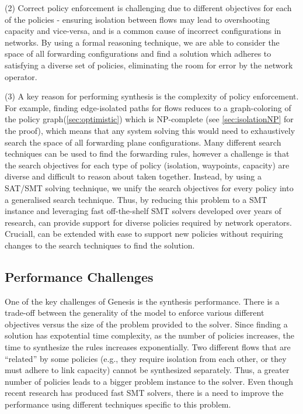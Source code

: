 
(2) Correct policy enforcement is challenging due to different
objectives for each of the policies - ensuring isolation between flows
may lead to overshooting capacity and vice-versa, and is a common
cause of incorrect configurations in networks. By using a formal
reasoning technique, we are able to consider the space of all
forwarding configurations and find a solution which adheres to
satisfying a diverse set of policies, eliminating the room for error
by the network operator. 

(3) A key reason for performing synthesis is the complexity of
policy enforcement. For example, finding edge-isolated paths
 for flows reduces to a
graph-coloring of the policy graph(\cref{sec:optimistic}) which is
NP-complete (see \cref{sec:isolationNP} for the proof), which means
that any system solving this would need to exhaustively search the
space of all forwarding plane configurations. Many different search
techniques can be used to find the forwarding rules, however a
challenge is that the search objectives for each type of policy
(isolation, waypoints, capacity) are diverse and difficult to reason
about taken together. Instead, by using a SAT/SMT solving technique,
we unify the search objectives for every policy into a generalised
search technique. Thus, by reducing this problem to a SMT instance and
leveraging fast off-the-shelf SMT solvers developed over years of
research, \Name can provide support for diverse policies required by
network operators. Cruciall, \Name can be extended with ease to
support new policies without requiring changes to the search
techniques to find the solution.

\subsection{Performance Challenges} \label{sec:performance}

One of the key challenges of Genesis is the synthesis
performance. There is a trade-off between the generality of the model
to enforce various different objectives versus the size of the problem
provided to the solver.  Since finding a solution has expotential time
complexity, as the number of policies increases, the time to
synthesize the rules increases exponentially. Two different flows that
are ``related'' by some policies (e.g., they require isolation from
each other, or they must adhere to link capacity) cannot be
synthesized separately.  Thus, a greater number of policies leads to a
bigger problem instance to the solver. Even though recent research has
produced fast SMT solvers, there is a need to improve the performance
using different techniques specific to this problem.

